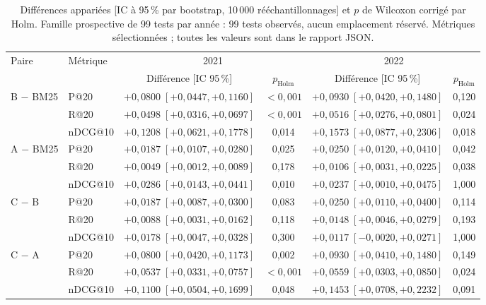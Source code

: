 \documentclass{article}
\begin{document}
\begin{table}[t]
  \caption{Différences appariées [IC à 95\,\% par bootstrap, 10\,000 rééchantillonnages] et $p$ de Wilcoxon corrigé par Holm. Famille prospective de 99 tests par année : 99 tests observés, aucun emplacement réservé. Métriques sélectionnées ; toutes les valeurs sont dans le rapport JSON.}
  \label{tab:diff-exp1}
  \centering
  \small
  \setlength{\tabcolsep}{2.5pt}
  \begin{tabular}{llcccc}
    \toprule
    Paire & Métrique & \multicolumn{2}{c}{2021} & \multicolumn{2}{c}{2022} \\
    & & Différence [IC 95\,\%] & $p_{\mathrm{Holm}}$ & Différence [IC 95\,\%] & $p_{\mathrm{Holm}}$ \\
    \midrule
    B $-$ BM25 & P@20 & $+0{,}0800\;[+0{,}0447, +0{,}1160]$ & $<0{,}001$ & $+0{,}0930\;[+0{,}0420, +0{,}1480]$ & 0{,}120 \\
     & R@20 & $+0{,}0498\;[+0{,}0316, +0{,}0697]$ & $<0{,}001$ & $+0{,}0516\;[+0{,}0276, +0{,}0801]$ & 0{,}024 \\
     & nDCG@10 & $+0{,}1208\;[+0{,}0621, +0{,}1778]$ & 0{,}014 & $+0{,}1573\;[+0{,}0877, +0{,}2306]$ & 0{,}018 \\
    \midrule
    A $-$ BM25 & P@20 & $+0{,}0187\;[+0{,}0107, +0{,}0280]$ & 0{,}025 & $+0{,}0250\;[+0{,}0120, +0{,}0410]$ & 0{,}042 \\
     & R@20 & $+0{,}0049\;[+0{,}0012, +0{,}0089]$ & 0{,}178 & $+0{,}0106\;[+0{,}0031, +0{,}0225]$ & 0{,}038 \\
     & nDCG@10 & $+0{,}0286\;[+0{,}0143, +0{,}0441]$ & 0{,}010 & $+0{,}0237\;[+0{,}0010, +0{,}0475]$ & 1{,}000 \\
    \midrule
    C $-$ B & P@20 & $+0{,}0187\;[+0{,}0087, +0{,}0300]$ & 0{,}083 & $+0{,}0250\;[+0{,}0110, +0{,}0400]$ & 0{,}114 \\
     & R@20 & $+0{,}0088\;[+0{,}0031, +0{,}0162]$ & 0{,}118 & $+0{,}0148\;[+0{,}0046, +0{,}0279]$ & 0{,}193 \\
     & nDCG@10 & $+0{,}0178\;[+0{,}0047, +0{,}0328]$ & 0{,}300 & $+0{,}0117\;[-0{,}0020, +0{,}0271]$ & 1{,}000 \\
    \midrule
    C $-$ A & P@20 & $+0{,}0800\;[+0{,}0420, +0{,}1173]$ & 0{,}002 & $+0{,}0930\;[+0{,}0410, +0{,}1480]$ & 0{,}149 \\
     & R@20 & $+0{,}0537\;[+0{,}0331, +0{,}0757]$ & $<0{,}001$ & $+0{,}0559\;[+0{,}0303, +0{,}0850]$ & 0{,}024 \\
     & nDCG@10 & $+0{,}1100\;[+0{,}0504, +0{,}1699]$ & 0{,}048 & $+0{,}1453\;[+0{,}0708, +0{,}2232]$ & 0{,}091 \\

\end{tabular}
\end{table}
\end{document}
